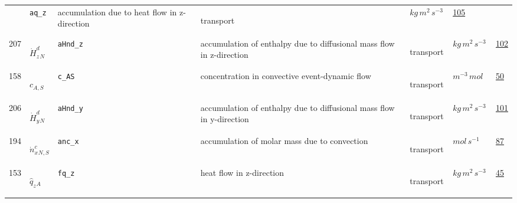 \begin{longtable}{|p{1cm}|p{2.5cm}|p{4.5cm}|p{8cm}|p{3.0cm}|p{3cm}|p{1cm}|}
             & \verb|aq_z|
             & accumulation due to heat flow in z-direction
             & \begin{lay}transport \end{lay}
             & $ kg \,m^{2} \,s^{-3} \, $
             &                 \hyperlink{"e:105"}{ 105 }
                 \\
            207
             & \hypertarget{"v:207"}{ $ {{\dot{H}^d_z}}{_{N}} $}
             & \verb|aHnd_z|
             & accumulation of enthalpy due to diffusional mass flow in z-direction
             & \begin{lay}transport \end{lay}
             & $ kg \,m^{2} \,s^{-3} \, $
             &                 \hyperlink{"e:102"}{ 102 }
                 \\
            158
             & \hypertarget{"v:158"}{ $ {c}{_{A, S}} $}
             & \verb|c_AS|
             & concentration in convective event-dynamic flow
             & \begin{lay}transport \end{lay}
             & $ m^{-3} \,mol \, $
             &                 \hyperlink{"e:50"}{ 50 }
                 \\
            206
             & \hypertarget{"v:206"}{ $ {{\dot{H}^d_y}}{_{N}} $}
             & \verb|aHnd_y|
             & accumulation of enthalpy due to diffusional mass flow in y-direction
             & \begin{lay}transport \end{lay}
             & $ kg \,m^{2} \,s^{-3} \, $
             &                 \hyperlink{"e:101"}{ 101 }
                 \\
            194
             & \hypertarget{"v:194"}{ $ {{\dot{n}^c_x}}{_{N, S}} $}
             & \verb|anc_x|
             & accumulation of molar mass due to convection
             & \begin{lay}transport \end{lay}
             & $ mol \,s^{-1} \, $
             &                 \hyperlink{"e:87"}{ 87 }
                 \\
            153
             & \hypertarget{"v:153"}{ $ {{\hat{q}_z}}{_{A}} $}
             & \verb|fq_z|
             & heat flow in z-direction
             & \begin{lay}transport \end{lay}
             & $ kg \,m^{2} \,s^{-3} \, $
             &                 \hyperlink{"e:45"}{ 45 }
                 \\

\end{longtable}
